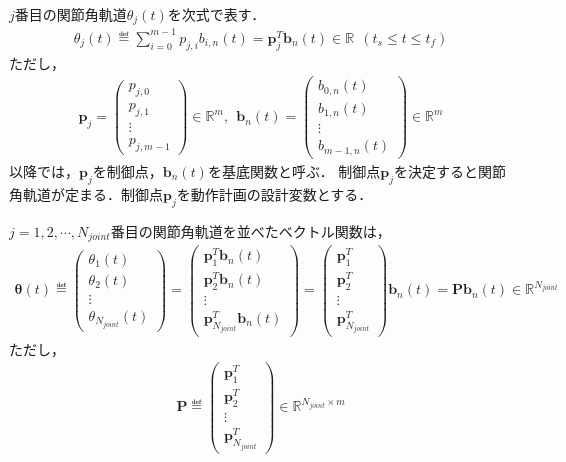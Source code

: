 $j$番目の関節角軌道$\theta_j (t)$を次式で表す．
\begin{eqnarray}
  \theta_j (t) \eqdef \sum_{i=0}^{m-1} p_{j,i} b_{i, n}(t) = \bm{p}_j^T \bm{b}_n(t) \in \mathbb{R} \ \ (t_s \leq t \leq t_f) \label{eq:bspline-theta-j}
\end{eqnarray}
ただし，
\begin{eqnarray}
  \bm{p}_j = \begin{pmatrix} p_{j,0} \\ p_{j,1} \\ \vdots \\ p_{j,m-1} \end{pmatrix} \in \mathbb{R}^m, \ \ 
  \bm{b}_n(t) = \begin{pmatrix} b_{0,n}(t) \\ b_{1,n}(t) \\ \vdots \\ b_{m-1,n}(t) \end{pmatrix} \in \mathbb{R}^m
\end{eqnarray}
以降では，$\bm{p}_j$を制御点，$\bm{b}_n(t)$を基底関数と呼ぶ．
制御点$\bm{p}_j$を決定すると関節角軌道が定まる．制御点$\bm{p}_j$を動作計画の設計変数とする．

$j=1,2,\cdots,N_{\mathit{joint}}$番目の関節角軌道を並べたベクトル関数は，
\begin{eqnarray}
  \bm{\theta}(t) \eqdef \begin{pmatrix} \theta_1(t) \\ \theta_2(t) \\ \vdots \\ \theta_{N_{\mathit{joint}}}(t) \end{pmatrix}
  = \begin{pmatrix} \bm{p}_1^T \bm{b}_n(t) \\ \bm{p}_2^T \bm{b}_n(t) \\ \vdots \\ \bm{p}_{N_{\mathit{joint}}}^T \bm{b}_n(t) \end{pmatrix}
  = \begin{pmatrix} \bm{p}_1^T \\ \bm{p}_2^T \\ \vdots \\ \bm{p}_{N_{\mathit{joint}}}^T \end{pmatrix} \bm{b}_n(t)
  = \bm{P} \bm{b}_n(t)
  \in \mathbb{R}^{N_{\mathit{joint}}} \label{eq:spline-theta-vec}
\end{eqnarray}
ただし，
\begin{eqnarray}
  \bm{P} \eqdef \begin{pmatrix} \bm{p}_1^T \\ \bm{p}_2^T \\ \vdots \\ \bm{p}_{N_{\mathit{joint}}}^T \end{pmatrix} \in \mathbb{R}^{N_{\mathit{joint}} \times m}
\end{eqnarray}

